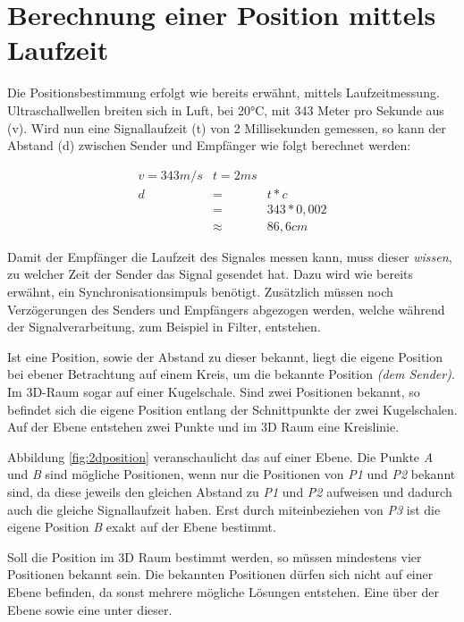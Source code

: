\chapter{Berechnung einer Position mittels Laufzeit}
\label{cha:positionsberechnung}

Die Positionsbestimmung erfolgt wie bereits erwähnt, mittels Laufzeitmessung. Ultraschallwellen breiten sich in Luft, bei 20°C, mit 343 Meter pro Sekunde aus (v). Wird nun eine Signallaufzeit (t) von 2 Millisekunden gemessen, so kann der Abstand (d) zwischen Sender und Empfänger wie folgt berechnet werden: 

\begin{eqnarray}
v = 343 m/s &t = 2ms \nonumber  \\
d 	&=& t * c \nonumber  \\
 	&=& 343 * 0,002 \nonumber  \\
	&\approx& 86,6 cm
\end{eqnarray}

Damit der Empfänger die Laufzeit des Signales messen kann, muss dieser \emph{wissen}, zu welcher Zeit der Sender das Signal gesendet hat. Dazu wird wie bereits erwähnt, ein Synchronisationsimpuls benötigt. Zusätzlich müssen noch Verzögerungen des Senders und Empfängers abgezogen werden, welche während der Signalverarbeitung, zum Beispiel in Filter, entstehen. 

Ist eine Position, sowie der Abstand zu dieser bekannt, liegt die eigene Position bei ebener Betrachtung auf einem Kreis, um die bekannte Position \emph{(dem Sender)}. Im 3D-Raum sogar auf einer Kugelschale. Sind zwei Positionen bekannt, so befindet sich die eigene Position entlang der Schnittpunkte der zwei Kugelschalen. Auf der Ebene entstehen zwei Punkte und im 3D Raum eine Kreislinie. 

Abbildung \ref{fig:2dposition} veranschaulicht das auf einer Ebene. Die Punkte \emph{A} und \emph{B} sind mögliche Positionen, wenn nur die Positionen von \emph{P1} und \emph{P2} bekannt sind, da diese jeweils den gleichen Abstand zu \emph{P1} und \emph{P2} aufweisen und dadurch auch die gleiche Signallaufzeit haben. Erst durch miteinbeziehen von \emph{P3} ist die eigene Position \emph{B} exakt auf der Ebene bestimmt.

Soll die Position im 3D Raum bestimmt werden, so müssen mindestens vier Positionen bekannt sein. Die bekannten Positionen dürfen sich nicht auf einer Ebene befinden, da sonst mehrere mögliche Lösungen entstehen. Eine über der Ebene sowie eine unter dieser.

